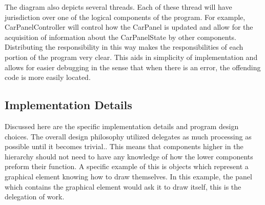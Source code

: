 \documentclass{article} %
\begin{document}
The diagram also depicts several threads.
Each of these thread will have jurisdiction over one of the logical components of the program. For example, CarPanelController will control how the CarPanel is updated and allow for the acquisition of information about the CarPanelState by other components.
Distributing the responsibility in this way makes the responsibilities of each portion of the program very clear.
This aids in simplicity of implementation and allows for easier debugging in the sense that when there is an error, the offending code is more easily located.

\subsection{Implementation Details}
Discussed here are the specific implementation details and program design choices.
The overall design philosophy utilized delegates as much processing as possible until it becomes trivial..
This means that components higher in the hierarchy should not need to have any knowledge of how the lower components preform their function.
A specific example of this is objects which represent a graphical element knowing how to draw themselves. In this example, the panel which contains the graphical element would ask it to draw itself, this is the delegation of work. 

\end{document}
